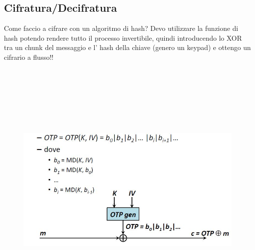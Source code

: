 \subsection{Cifratura/Decifratura} 
Come faccio a cifrare con un algoritmo di hash? Devo utilizzare la funzione di hash potendo rendere tutto il processo invertibile, quindi introducendo lo XOR tra un chunk del messaggio e l' hash della chiave (genero un keypad) e ottengo un cifrario a flusso!!
\begin{figure}
	\begin{center}
	{\includegraphics[height=13cm, width=13cm, keepaspectratio]{Immagini/hash/schema_cifratura_flusso.JPG}}
	\end{center}
\end{figure}

